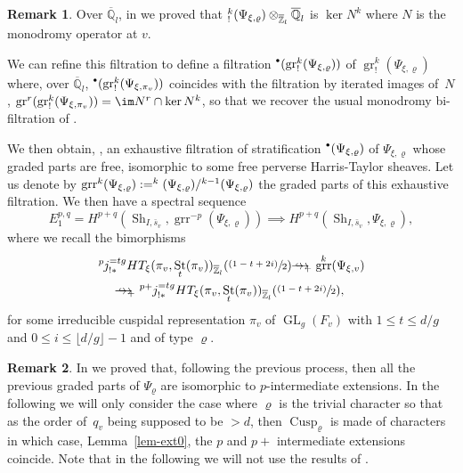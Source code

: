 \documentclass[JEP,XML,SOM,Unicode,published]{cedram}
\newcommand{\NoChangel}[1]{%
\expandafter\let\csname old\string#1\endcsname=#1
\let#1=\relax
\newcommand{#1}{\mathcode`l="716C\csname old\string#1\endcsname\mathcode`l="7160 }%
}
\newcommand{\onto}{\mathchoice{\to\hspace*{-5mm}\to}{\to\hspace*{-2.85mm}\to}{\to\hspace*{-3mm}\to}{\to\hspace*{-3mm}\to}}
\newcommand{\sbullet}{{\scriptscriptstyle\bullet}}
\newcommand{\csbullet}{{\raisebox{1pt}{$\sbullet$}}}
\newcommand{\psfrac}[2]{\sfrac{(#1)}{#2}}
\DeclareMathOperator{\GL}{GL}
\newcommand*{\htarrow}{\lhook\joinrel\onto}
\newcommand*{\htarrowp}{\mathrel{{\htarrow}_+}}
\theoremstyle{plain}
\theoremstyle{definition}
\newtheorem*{remark}{Remark}
\numberwithin{equation}{subsection}
\newcommand\Qm{{\mathbb Q}}
\newcommand\Zm{{\mathbb Z}}
\newcommand{\lexp}[2]{\kern \scriptspace \vphantom{#2}^{#1}\kern-\scriptspace#2}
\DeclareMathOperator{\sh}{Sh}
\DeclareMathOperator{\cusp}{Cusp}
\DeclareMathOperator{\st}{St}
\DeclareMathOperator{\gr}{gr}
\DeclareMathOperator{\grr}{grr}
\DeclareMathOperator{\Fil}{Fil}\NoChangel{\Fil}
\DeclareMathOperator{\Fill}{Fill}\NoChangel{\Fill}
\begin{document}
\begin{remark}
Over $\overline \Qm_l$, in \cite{boyer-torsion} we proved that
$\Fil^k_!(\Psi_{\xi,\varrho}) \otimes_{\overline \Zm_l} \overline \Qm_l$
is $\ker N^k$ where $N$ is the monodromy operator at $v$.

We can refine this filtration to define a filtration
$\Fil^{\csbullet} (\gr^k_!(\Psi_{\xi,\varrho}))$ of $\gr^k_!(\Psi_{\xi,\varrho})$ where,
over $\overline \Qm_l$,
$\Fil^{\csbullet} (\gr^k_!(\Psi_{\xi,\pi_v}))$
coincides with the filtration by iterated images of~$N$, \ie $\gr^r(\gr^k_!(\Psi_{\xi,\pi_v}))=\im N^r \cap \ker N^k$, so that
we recover the usual monodromy bi-filtration of \cite{boyer-invent2}.

We then obtain, \cf \cite{boyer-torsion}, an exhaustive filtration
of stratification $\Fill^{\csbullet}(\Psi_{\xi,\varrho})$ of $\Psi_{\xi,\varrho}$ whose graded parts are free,
isomorphic to some free perverse Harris-Taylor sheaves.
Let us denote by $\grr^k(\Psi_{\xi,\varrho}):=\Fill^k(\Psi_{\xi,\varrho})/\Fill^{k-1}(\Psi_{\xi,\varrho})$
the graded parts of this exhaustive filtration.
We then have a spectral sequence
\begin{equation} \label{eq-ss1}
E_1^{p,q}=H^{p+q}(\sh_{I,\bar s_v},\grr^{-p}(\Psi_{\xi,\varrho})) \implies
H^{p+q}(\sh_{I,\bar s_v},\Psi_{\xi,\varrho}),
\end{equation}
where we recall the bimorphisms
\begin{multline} \label{eq-grppsi}
\lexp p j^{=tg}_{!*} HT_\xi(\pi_v,\st_t(\pi_v))_{\overline \Zm_l}(\psfrac{1-t+2i}{2}) \htarrowp
\grr^k(\Psi_{\xi,v})\\
\htarrowp \lexp {p+} j^{=tg}_{!*} HT_\xi(\pi_v,\st_t(\pi_v))_{\overline \Zm_l}(\psfrac{1-t+2i}{2}),
\end{multline}
for some irreducible cuspidal representation $\pi_v$ of $\GL_g(F_v)$ with $1 \leq t \leq d/g$ and
$0 \leq i \leq \lfloor d/g \rfloor -1$ and of type $\varrho$.
\end{remark}

\begin{remark}
In \cite{boyer-duke} we proved that, following the previous process, then all the previous graded parts of $\Psi_{\varrho}$
are isomorphic to $p$-intermediate extensions.
In the following we will only consider the
case where $\varrho$ is the trivial character so that as the order of~$q_v$
being supposed
to be $>d$, then $\cusp_\varrho$ is made of characters
in which case, \cf Lem\-ma~\ref{lem-ext0}, the $p$ and $p+$ intermediate extensions
coincide. Note that in the following
we will not use the results of \cite{boyer-duke}.
\end{remark}
\end{document}
